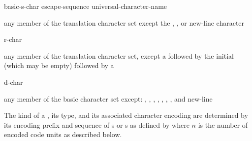 \begin{bnf}
\br
    basic-s-char\br
    escape-sequence\br
    universal-character-name
\end{bnf}

\begin{bnf}
\br
    \textnormal{any member of the translation character set except the ,}\br
    \bnfindent\textnormal{, or new-line character}
\end{bnf}

\begin{bnf}
\br
      \terminal{(}  \terminal{)}  
\end{bnf}

\begin{bnf}
\br
    r-char 
\end{bnf}

\begin{bnf}
\br
    \textnormal{any member of the translation character set, except a  followed by}\br
    \bnfindent\textnormal{the initial  (which may be empty) followed by a }
\end{bnf}

\begin{bnf}
\br
    d-char 
\end{bnf}

\begin{bnf}
\br
    \textnormal{any member of the basic character set except:}\br
    \bnfindent\textnormal{, , , ,}\br
    \bnfindent\textnormal{, , , and new-line}
\end{bnf}

\pnum
{}%
%
%
%
%
%
%
%
%
The kind of a ,
its type, and
its associated character encoding
are determined by its encoding prefix and sequence of
s or s
as defined by 
where $n$ is the number of encoded code units as described below.

